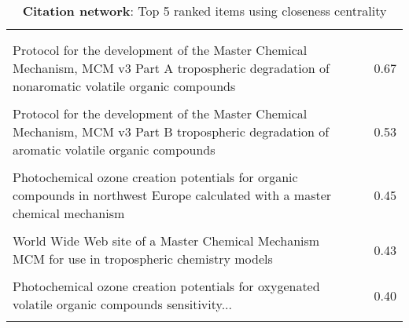 \begin{table}[H]
     \begin{tabular}{p{}p{}c}
     \toprule
      & & \\\\
     Protocol for the development of the Master Chemical Mechanism, MCM v3 Part A tropospheric degradation of nonaromatic volatile organic compounds & \cite{closeness0} & 0.67  \\ \\
        Protocol for the development of the Master Chemical Mechanism, MCM v3 Part B tropospheric degradation of aromatic volatile organic compounds & \cite{closeness1} & 0.53  \\ \\
        Photochemical ozone creation potentials for organic compounds in northwest Europe calculated with a master chemical mechanism & \cite{closeness2} & 0.45  \\ \\
        World Wide Web site of a Master Chemical Mechanism MCM for use in tropospheric chemistry models & \cite{closeness3} & 0.43  \\ \\
        Photochemical ozone creation potentials for oxygenated volatile organic compounds sensitivity... & \cite{closeness4} & 0.40  \\ \\
        \bottomrule
    \end{tabular}
    \label{tab:closeness_Citation}
    \caption{\textbf{Citation network}: Top 5 ranked items using closeness centrality}
    \end{table}

    